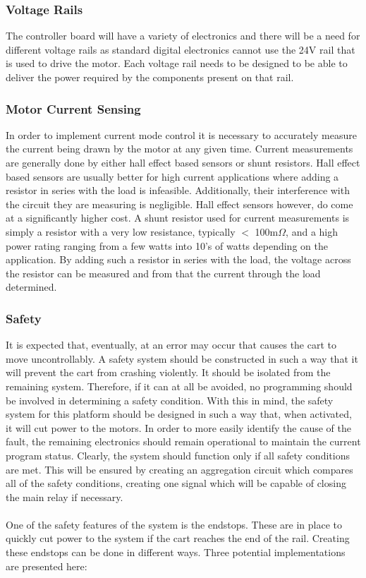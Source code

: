 \subsubsection{Voltage Rails}
The controller board will have a variety of electronics and there will be a need for different voltage rails as standard digital electronics cannot use the 24V rail that is used to drive the motor.
Each voltage rail needs to be designed to be able to deliver the power required by the components present on that rail.

\subsubsection{Motor Current Sensing}
In order to implement current mode control it is necessary to accurately measure the current being drawn by the motor at any given time.
Current measurements are generally done by either hall effect based sensors or shunt resistors. 
Hall effect based sensors are usually better for high current applications where adding a resistor in series with the load is infeasible. 
Additionally, their interference with the circuit they are measuring is negligible.
Hall effect sensors however, do come at a significantly higher cost.
A shunt resistor used for current measurements is simply a resistor with a very low resistance, typically $<$ 100m$\Omega$, and a high power rating ranging from a few watts into 10's of watts depending on the application.
By adding such a resistor in series with the load, the voltage across the resistor can be measured and from that the current through the load determined.


\subsubsection{Safety} %
\label{subsub:safety}
It is expected that, eventually, at an error may occur that causes the cart to move uncontrollably.
A safety system should be constructed in such a way that it will prevent the cart from crashing violently.
It should be isolated from the remaining system.
Therefore, if it can at all be avoided, no programming should be involved in determining a safety condition.
With this in mind, the safety system for this platform should be designed in such a way that, when activated, it will cut power to the motors.
In order to more easily identify the cause of the fault, the remaining electronics should remain operational to maintain the current program status.
Clearly, the system should function only if all safety conditions are met.
This will be ensured by creating an aggregation circuit which compares all of the safety conditions, creating one signal which will be capable of closing the main relay if necessary.
\\~\\
One of the safety features of the system is the endstops.
These are in place to quickly cut power to the system if the cart reaches the end of the rail.
Creating these endstops can be done in different ways.
Three potential implementations are presented here:
